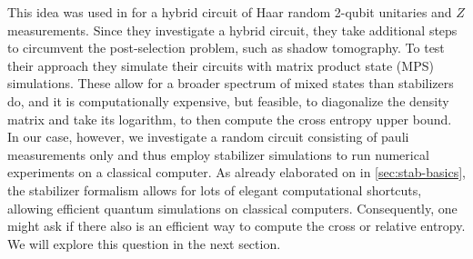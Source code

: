 This idea was used in \cite{garrattProbingPostmeasurementEntanglement2023} for
a hybrid circuit of Haar random 2-qubit unitaries and $Z$ measurements. Since
they investigate a hybrid circuit, they take additional steps to circumvent the
post-selection problem, such as shadow tomography. To test their approach they
simulate their circuits with matrix product state (MPS) simulations. These
allow for a broader spectrum of mixed states than stabilizers do, and it is
computationally expensive, but feasible, to diagonalize the density matrix and
take its logarithm, to then compute the cross entropy upper bound. In our case,
however, we investigate a random circuit consisting of pauli measurements only
and thus employ stabilizer simulations to run numerical experiments on a
classical computer. As already elaborated on in \cref{sec:stab-basics},
the stabilizer formalism allows for lots of elegant computational shortcuts,
allowing efficient quantum simulations on classical computers. Consequently,
one might ask if there also is an efficient way to compute the cross or
relative entropy. We will explore this question in the next section.



